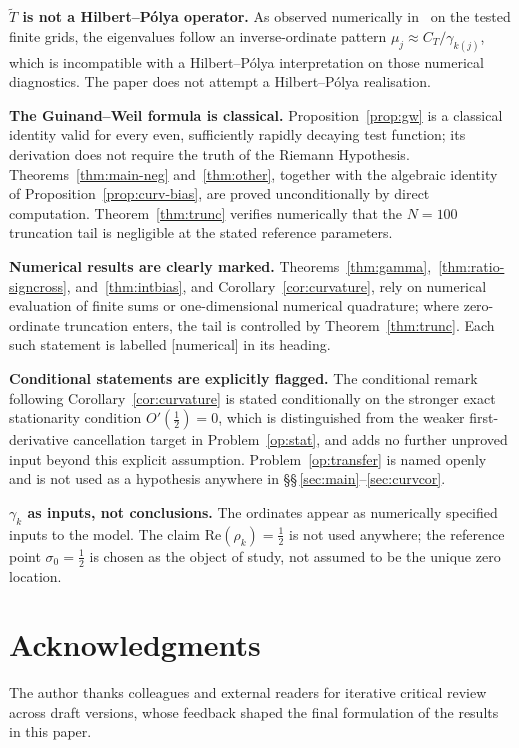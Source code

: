 \documentclass[11pt]{article}
\newcommand{\Tt}{\widetilde{T}}
\newcommand{\CT}{C_{T}}
\begin{document}
\textbf{$\Tt$ is not a Hilbert--P\'olya operator.}
As observed numerically in~\cite{Paper5} on the tested finite grids,
the eigenvalues follow an inverse-ordinate pattern
$\mu_j\approx\CT/\gamma_{k(j)}$, which is incompatible with a
Hilbert--P\'olya interpretation on those numerical diagnostics.
The paper does not attempt a Hilbert--P\'olya realisation.

\textbf{The Guinand--Weil formula is classical.}
Proposition~\ref{prop:gw} is a classical identity valid for every even,
sufficiently rapidly decaying test function; its derivation does not
require the truth of the Riemann Hypothesis.
Theorems~\ref{thm:main-neg} and~\ref{thm:other}, together with the
algebraic identity of Proposition~\ref{prop:curv-bias}, are proved
unconditionally by direct computation.
Theorem~\ref{thm:trunc} verifies numerically that the
$N=100$ truncation tail is negligible at the stated reference parameters.

\textbf{Numerical results are clearly marked.}
Theorems~\ref{thm:gamma},~\ref{thm:ratio-signcross},
and~\ref{thm:intbias}, and Corollary~\ref{cor:curvature}, rely on
numerical evaluation of finite sums or one-dimensional numerical
quadrature; where zero-ordinate truncation enters, the tail is
controlled by Theorem~\ref{thm:trunc}.
Each such statement is labelled [numerical] in its heading.

\textbf{Conditional statements are explicitly flagged.}
The conditional remark following Corollary~\ref{cor:curvature} is
stated conditionally on the stronger exact stationarity condition
$O'(\tfrac12)=0$, which is distinguished from the weaker
first-derivative cancellation target in Problem~\ref{op:stat},
and adds no further unproved input beyond this explicit assumption.
Problem~\ref{op:transfer} is named openly and is not used as a
hypothesis anywhere in \S\S\,\ref{sec:main}--\ref{sec:curvcor}.

\textbf{$\gamma_k$ as inputs, not conclusions.}
The ordinates appear as numerically specified inputs to the model.
The claim $\mathrm{Re}(\rho_k)=\tfrac12$ is not used anywhere; the
reference point $\sigma_0=\tfrac12$ is chosen as the object of study,
not assumed to be the unique zero location.

\section*{Acknowledgments}

The author thanks colleagues and external readers for iterative
critical review across draft versions, whose feedback shaped the
final formulation of the results in this paper.
\end{document}
